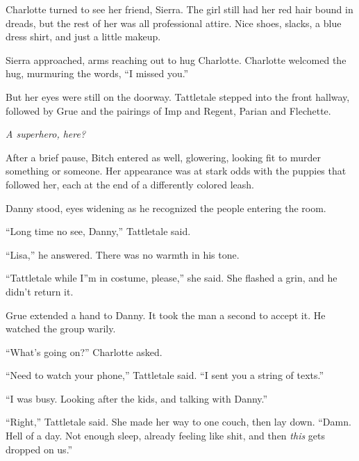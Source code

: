 Charlotte turned to see her friend, Sierra.  The girl still had her red hair bound in dreads, but the rest of her was all professional attire.  Nice shoes, slacks, a blue dress shirt, and just a little makeup.



Sierra approached, arms reaching out to hug Charlotte.  Charlotte welcomed the hug, murmuring the words, ``I missed you.''



But her eyes were still on the doorway.  Tattletale stepped into the front hallway, followed by Grue and the pairings of Imp and Regent, Parian and Flechette.



\emph{A superhero, here?}



After a brief pause, Bitch entered as well, glowering, looking fit to murder something or someone.  Her appearance was at stark odds with the puppies that followed her, each at the end of a differently colored leash.



Danny stood, eyes widening as he recognized the people entering the room.



``Long time no see, Danny,'' Tattletale said.



``Lisa,'' he answered.  There was no warmth in his tone.



``Tattletale while I''m in costume, please,'' she said.  She flashed a grin, and he didn't return it.



Grue extended a hand to Danny.  It took the man a second to accept it.  He watched the group warily.



``What's going on?'' Charlotte asked.



``Need to watch your phone,'' Tattletale said.  ``I sent you a string of texts.''



``I was busy.  Looking after the kids, and talking with Danny.''



``Right,'' Tattletale said.  She made her way to one couch, then lay down.  ``Damn.  Hell of a day.  Not enough sleep, already feeling like shit, and then \emph{this} gets dropped on us.''



